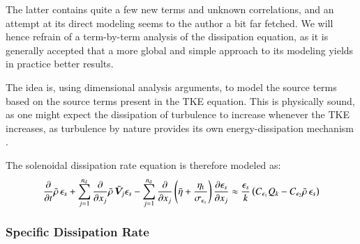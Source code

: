 \documentclass{warpdoc}
\newcommand{\nd}{{{n}_{\rm d}}}
\newcommand{\turb}{_{\rm t}}
\newcommand{\etat}{{\eta\turb}}
\newcommand{\mfd}{\displaystyle}
\begin{document}
The latter contains quite a few new terms and unknown correlations, and an attempt
at its direct modeling seems to the author a bit far fetched.
We will hence refrain of a term-by-term analysis of the dissipation equation,
as it is generally
accepted that a more global and simple approach to its modeling \cite{turb:vandromme}
yields in practice better results.

The idea is, using dimensional analysis arguments,
to model the source terms based on the source terms present in the TKE equation.
This is physically sound, as one might expect the dissipation of turbulence to
increase whenever the TKE increases, as turbulence by nature provides
its own energy-dissipation mechanism \cite{turb:tennekes}.

The solenoidal dissipation rate equation is therefore modeled as:
%
\begin{equation}
 \begin{array}{r}
         \mfd \frac{\partial }{\partial t} \wbar{\rho}\, \epsilon_s
        +\mfd\sum_{j=1}^{\nd}
           \frac{\partial }{\partial x_j} \wbar{\rho}\, {\wtilde{\bm{V}}_j} \epsilon_s
        -\sum_{j=1}^\nd \frac{\partial }{\partial x_j} \left( \wbar{\eta} +\frac{\etat}{\sigma_{\epsilon_s}} \right)\frac{\partial \epsilon_s}{\partial x_j}
 \approx 
 \frac{\epsilon_s}{k} \left( C_{\epsilon_1}  Q_k - C_{\epsilon_2} \wbar{\rho}\, \epsilon_s   \right)
 \end{array}
\label{eqn:SDR:modeled:final}
\end{equation}
%


\subsubsection{Specific Dissipation Rate}
\end{document}
